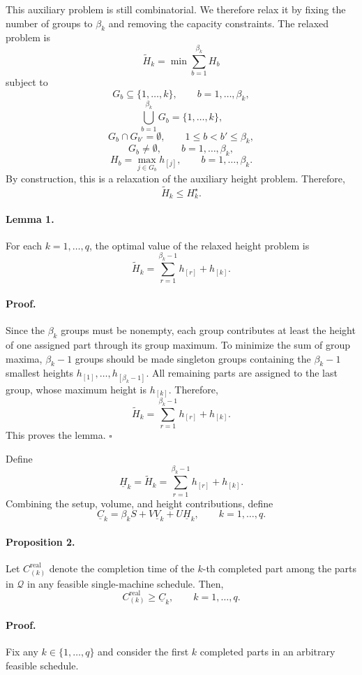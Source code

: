 \documentclass[review,3p,times,authoryear]{elsarticle}
\newcounter{lemma}
\begin{document}
This auxiliary problem is still combinatorial. We therefore relax it by
fixing the number of groups to $\beta_k$ and removing the capacity
constraints. The relaxed problem is
\[
\widetilde{H}_k
=
\min
\sum_{b=1}^{\beta_k}H_b
\]
subject to
\[
G_b\subseteq\{1,\dots,k\},\qquad b=1,\dots,\beta_k,
\]
\[
\bigcup_{b=1}^{\beta_k}G_b=\{1,\dots,k\},
\]
\[
G_b\cap G_{b'}=\emptyset,\qquad 1\le b<b'\le \beta_k,
\]
\[
G_b\neq\emptyset,\qquad b=1,\dots,\beta_k,
\]
\[
H_b=\max_{j\in G_b}h_{[j]},\qquad b=1,\dots,\beta_k.
\]
By construction, this is a relaxation of the auxiliary height problem.
Therefore,
\[
\widetilde{H}_k\le H_k^{\star}.
\]

\paragraph*{Lemma 1.}
For each $k=1,\dots,q$, the optimal value of the relaxed height problem is
\[
\widetilde{H}_k
=
\sum_{r=1}^{\beta_k-1}h_{[r]}+h_{[k]}.
\]

\paragraph*{Proof.}
Since the $\beta_k$ groups must be nonempty, each group contributes at least
the height of one assigned part through its group maximum. To minimize the
sum of group maxima, $\beta_k-1$ groups should be made singleton groups
containing the $\beta_k-1$ smallest heights
$h_{[1]},\dots,h_{[\beta_k-1]}$. All remaining parts are assigned to the last
group, whose maximum height is $h_{[k]}$. Therefore,
\[
\widetilde{H}_k
=
\sum_{r=1}^{\beta_k-1}h_{[r]}+h_{[k]}.
\]
This proves the lemma.
\hfill $\square$

Define
\[
\underline{H}_k=\widetilde{H}_k
=
\sum_{r=1}^{\beta_k-1}h_{[r]}+h_{[k]}.
\]
Combining the setup, volume, and height contributions, define
\[
\underline{C}_k
=
\beta_k S
+
V\underline{V}_k
+
U\underline{H}_k,
\qquad k=1,\dots,q.
\]

\paragraph*{Proposition 2.}
Let $C_{(k)}^{\mathrm{real}}$ denote the completion time of the $k$-th
completed part among the parts in $\mathcal{Q}$ in any feasible
single-machine schedule. Then,
\[
C_{(k)}^{\mathrm{real}}\ge \underline{C}_k,
\qquad k=1,\dots,q.
\]

\paragraph*{Proof.}
Fix any $k\in\{1,\dots,q\}$ and consider the first $k$ completed parts in an
arbitrary feasible schedule.
\end{document}
